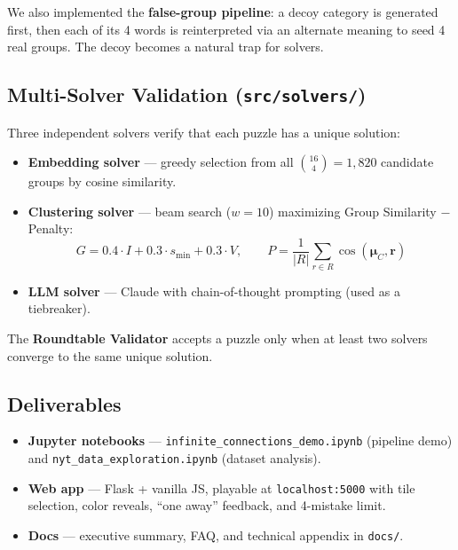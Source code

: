 \documentclass[11pt]{article}
\begin{document}
We also implemented the \textbf{false-group pipeline}: a decoy category is
generated first, then each of its 4 words is reinterpreted via an alternate
meaning to seed 4 real groups. The decoy becomes a natural trap for solvers.

\subsection{Multi-Solver Validation (\texttt{src/solvers/})}

Three independent solvers verify that each puzzle has a unique solution:

\begin{itemize}[nosep]
    \item \textbf{Embedding solver} --- greedy selection from all
          $\binom{16}{4} = 1{,}820$ candidate groups by cosine similarity.
    \item \textbf{Clustering solver} --- beam search ($w=10$) maximizing
          Group Similarity $-$ Penalty:
          \[
            G = 0.4 \cdot I + 0.3 \cdot s_{\min} + 0.3 \cdot V,
            \qquad
            P = \frac{1}{|R|}\sum_{r \in R} \cos(\boldsymbol{\mu}_C, \mathbf{r})
          \]
    \item \textbf{LLM solver} --- Claude with chain-of-thought prompting
          (used as a tiebreaker).
\end{itemize}

The \textbf{Roundtable Validator} accepts a puzzle only when at least two
solvers converge to the same unique solution.

\subsection{Deliverables}

\begin{itemize}[nosep]
    \item \textbf{Jupyter notebooks} ---
          \texttt{infinite\_connections\_demo.ipynb} (pipeline demo) and
          \texttt{nyt\_data\_exploration.ipynb} (dataset analysis).
    \item \textbf{Web app} --- Flask + vanilla JS, playable at
          \texttt{localhost:5000} with tile selection, color reveals,
          ``one away'' feedback, and 4-mistake limit.
    \item \textbf{Docs} --- executive summary, FAQ, and technical appendix
          in \texttt{docs/}.
\end{itemize}
\end{document}
